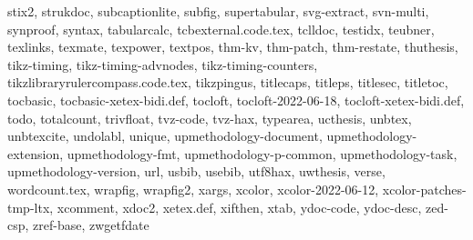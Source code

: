\documentclass{l3in2edoc}
\begin{document}
{  stix2, strukdoc, subcaptionlite, subfig, supertabular, svg-extract,
  svn-multi, synproof, syntax, tabularcalc, tcbexternal.code.tex,
  tclldoc, testidx, teubner, texlinks, texmate, texpower, textpos,
  thm-kv, thm-patch, thm-restate, thuthesis, tikz-timing,
  tikz-timing-advnodes, tikz-timing-counters,
  tikzlibraryrulercompass.code.tex, tikzpingus, titlecaps, titleps,
  titlesec, titletoc, tocbasic, tocbasic-xetex-bidi.def, tocloft,
  tocloft-2022-06-18, tocloft-xetex-bidi.def, todo, totalcount,
  trivfloat, tvz-code, tvz-hax, typearea, ucthesis, unbtex, unbtexcite,
  undolabl, unique, upmethodology-document, upmethodology-extension,
  upmethodology-fmt, upmethodology-p-common, upmethodology-task,
  upmethodology-version, url, usbib, usebib, utf8hax, uwthesis, verse,
  wordcount.tex, wrapfig, wrapfig2, xargs, xcolor, xcolor-2022-06-12,
  xcolor-patches-tmp-ltx, xcomment, xdoc2, xetex.def, xifthen, xtab,
  ydoc-code, ydoc-desc, zed-csp, zref-base, zwgetfdate}
\end{document}
